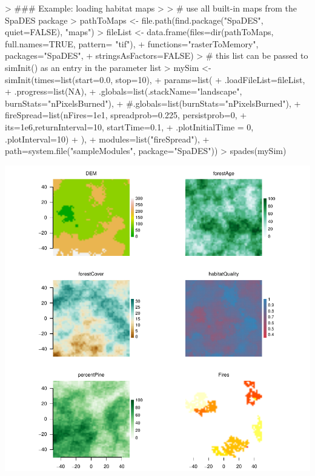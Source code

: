 \documentclass{article}
\begin{document}
\begin{Schunk}
\begin{Sinput}
> ### Example: loading habitat maps
>
> # use all built-in maps from the SpaDES package
> pathToMaps <- file.path(find.package("SpaDES", quiet=FALSE), "maps")
> fileList <- data.frame(files=dir(pathToMaps, full.names=TRUE, pattern= "tif"),
+                       functions="rasterToMemory", packages="SpaDES",
+                       stringsAsFactors=FALSE)
> # this list can be passed to simInit() as an entry in the parameter list
> mySim <- simInit(times=list(start=0.0, stop=10),
+                  params=list(
+                    .loadFileList=fileList,
+                    .progress=list(NA),
+                    .globals=list(.stackName="landscape", burnStats="nPixelsBurned"),
+                    #.globals=list(burnStats="nPixelsBurned"),
+                    fireSpread=list(nFires=1e1, spreadprob=0.225, persistprob=0,
+                                    its=1e6,returnInterval=10, startTime=0.1,
+                                    .plotInitialTime = 0, .plotInterval=10)
+                  ),
+                  modules=list("fireSpread"),
+                  path=system.file("sampleModules", package="SpaDES"))
> spades(mySim)
\end{Sinput}
\end{Schunk}
\includegraphics{introduction-load-landscape-maps}
\end{document}
